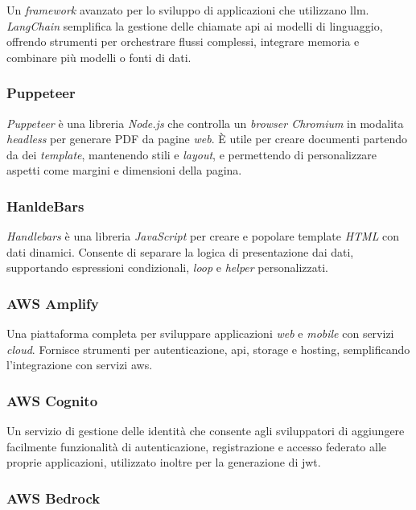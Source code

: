 Un \textit{framework} avanzato per lo sviluppo di applicazioni che utilizzano \gls{llm}. 
\textit{LangChain} semplifica la gestione delle chiamate \gls{api} ai modelli di linguaggio, offrendo strumenti per orchestrare flussi complessi, integrare memoria e combinare più modelli o fonti di dati.

\subsubsection{Puppeteer}

\textit{Puppeteer} è una libreria \textit{Node.js} che controlla un \textit{browser Chromium} in modalita \textit{headless} per generare PDF da pagine \textit{web}.
È utile per creare documenti partendo da dei \textit{template}, mantenendo stili e \textit{layout}, e permettendo di personalizzare aspetti come margini e dimensioni della pagina.

\subsubsection{HanldeBars}

\textit{Handlebars} è una libreria \textit{JavaScript} per creare e popolare template \textit{HTML} con dati dinamici. 
Consente di separare la logica di presentazione dai dati, supportando espressioni condizionali, \textit{loop} e \textit{helper} personalizzati.

\subsubsection{AWS Amplify}

Una piattaforma completa per sviluppare applicazioni \textit{web} e \textit{mobile} con servizi \textit{cloud}. 
Fornisce strumenti per autenticazione, \gls{api}, storage e hosting, semplificando l'integrazione con servizi \gls{aws}.

\subsubsection{AWS Cognito}

Un servizio di gestione delle identità che consente agli sviluppatori di aggiungere facilmente funzionalità di autenticazione, registrazione e accesso federato alle proprie applicazioni,
 utilizzato inoltre per la generazione di \gls{jwt}.

\subsubsection{AWS Bedrock}

